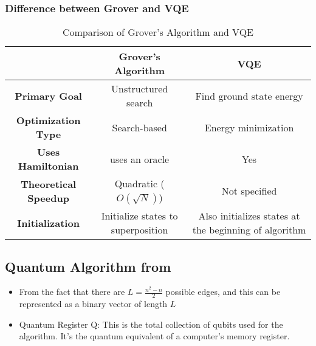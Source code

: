 \documentclass{Assignment}
\begin{document}
\subsubsection*{Difference between Grover and VQE}
\begin{table}[hbt!]
	\centering
	\caption{Comparison of Grover's Algorithm and VQE}
	\label{tab:grover_vqe_comparison}
	\begin{adjustbox}{max width=\textwidth}
		\begin{tabular}{|c|c|c|}
			\toprule
		
			& \textbf{Grover's Algorithm} & \textbf{VQE} \\
			\midrule
			\textbf{Primary Goal} & Unstructured search & Find ground state energy \\
			\hline
			\textbf{Optimization Type} & Search-based & Energy minimization \\
			\hline
			\textbf{Uses Hamiltonian} &uses an oracle & Yes \\
			\hline
			\textbf{Theoretical Speedup} & Quadratic ($O(\sqrt{N})$) & Not specified\\
	
			\hline
			\textbf{Initialization} & Initialize states to superposition & Also initializes states at the beginning of algorithm  \\
			\bottomrule
		\end{tabular}
	\end{adjustbox}
\end{table}
\newpage
\subsection*{Quantum Algorithm from \cite{PhysRevA.93.032301}}
\begin{itemize}
	\item From the fact that there are $L = \frac{n^2-n}{2}$ possible edges, and this can be represented as a binary vector of length $L$ 
	\item  Quantum Register Q: This is the total collection of qubits used for the algorithm. It's the quantum equivalent of a computer's memory register.
\end{itemize}
\end{document}
